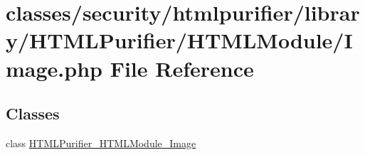 \hypertarget{Image_8php}{\section{classes/security/htmlpurifier/library/\+H\+T\+M\+L\+Purifier/\+H\+T\+M\+L\+Module/\+Image.php File Reference}
\label{Image_8php}
}
\subsection*{Classes}
\begin{DoxyCompactItemize}
\item 
class \hyperlink{classHTMLPurifier__HTMLModule__Image}{H\+T\+M\+L\+Purifier\+\_\+\+H\+T\+M\+L\+Module\+\_\+\+Image}
\end{DoxyCompactItemize}
